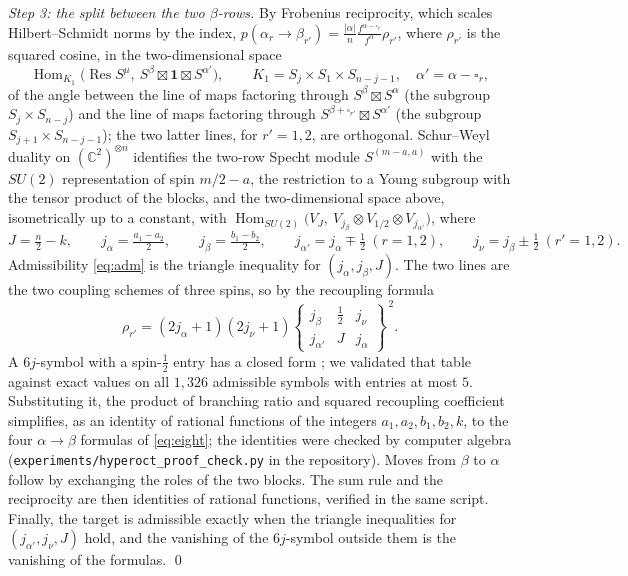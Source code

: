 \documentclass[11pt]{amsart}
\theoremstyle{definition}
\newcommand{\C}{\mathbb C}
\newcommand{\Hom}{\operatorname{Hom}}
\newcommand{\Res}{\operatorname{Res}}
\newcommand{\sixj}[6]{\begin{Bmatrix}#1&#2&#3\\#4&#5&#6\end{Bmatrix}}
\begin{document}
\emph{Step 3: the split between the two $\beta$-rows.} By Frobenius reciprocity, which scales Hilbert--Schmidt norms by the index, $p(\alpha_r\to\beta_{r'})=\frac{|\alpha|}n\frac{f^{\alpha-\square_r}}{f^\alpha}\rho_{r'}$, where $\rho_{r'}$ is the squared cosine, in the two-dimensional space
\[
\Hom_{K_1}\big(\Res S^\mu,\ S^\beta\boxtimes\mathbf1\boxtimes S^{\alpha'}\big),\qquad K_1=S_j\times S_1\times S_{n-j-1},\quad \alpha'=\alpha-\square_r,
\]
of the angle between the line of maps factoring through $S^\beta\boxtimes S^\alpha$ (the subgroup $S_j\times S_{n-j}$) and the line of maps factoring through $S^{\beta+\square_{r'}}\boxtimes S^{\alpha'}$ (the subgroup $S_{j+1}\times S_{n-j-1}$); the two latter lines, for $r'=1,2$, are orthogonal. Schur--Weyl duality on $(\C^2)^{\otimes n}$ identifies the two-row Specht module $S^{(m-a,a)}$ with the $SU(2)$ representation of spin $m/2-a$, the restriction to a Young subgroup with the tensor product of the blocks, and the two-dimensional space above, isometrically up to a constant, with $\Hom_{SU(2)}\big(V_J,\ V_{j_\beta}\otimes V_{1/2}\otimes V_{j_{\alpha'}}\big)$, where
\[
J=\tfrac n2-k,\qquad j_\alpha=\tfrac{a_1-a_2}2,\qquad j_\beta=\tfrac{b_1-b_2}2,\qquad j_{\alpha'}=j_\alpha\mp\tfrac12\ (r=1,2),\qquad j_\nu=j_\beta\pm\tfrac12\ (r'=1,2).
\]
Admissibility \eqref{eq:adm} is the triangle inequality for $(j_\alpha,j_\beta,J)$. The two lines are the two coupling schemes of three spins, so by the recoupling formula
\[
\rho_{r'}=(2j_\alpha+1)(2j_\nu+1)\sixj{j_\beta}{\tfrac12}{j_\nu}{j_{\alpha'}}{J}{j_\alpha}^{\,2}.
\]
A $6j$-symbol with a spin-$\tfrac12$ entry has a closed form \cite[Table~5]{Edmonds}; we validated that table against exact values on all $1{,}326$ admissible symbols with entries at most $5$. Substituting it, the product of branching ratio and squared recoupling coefficient simplifies, as an identity of rational functions of the integers $a_1,a_2,b_1,b_2,k$, to the four $\alpha\to\beta$ formulas of \eqref{eq:eight}; the identities were checked by computer algebra (\texttt{experiments/hyperoct\_proof\_check.py} in the repository). Moves from $\beta$ to $\alpha$ follow by exchanging the roles of the two blocks. The sum rule and the reciprocity are then identities of rational functions, verified in the same script. Finally, the target is admissible exactly when the triangle inequalities for $(j_{\alpha'},j_\nu,J)$ hold, and the vanishing of the $6j$-symbol outside them is the vanishing of the formulas. \qed
\end{document}
